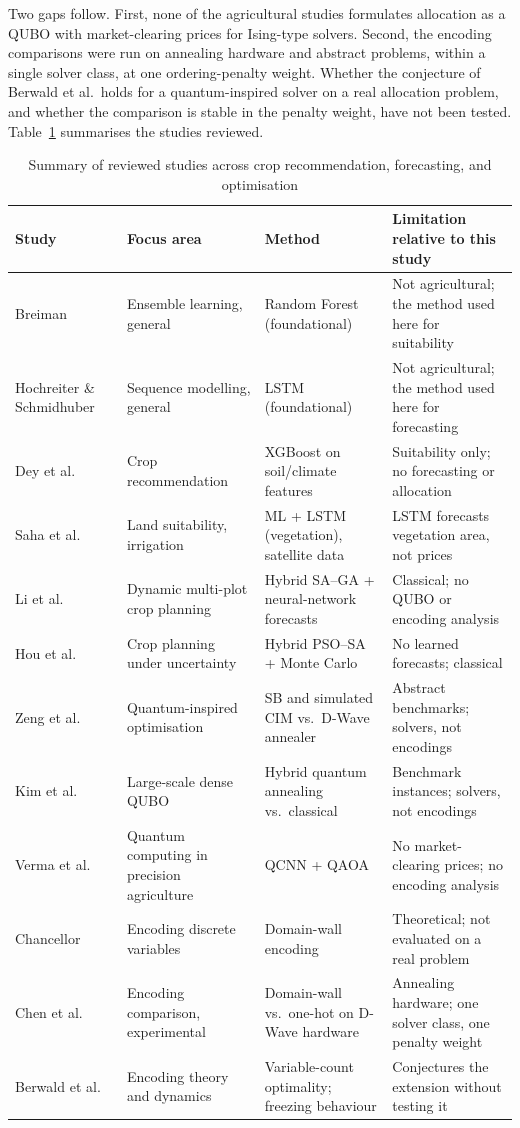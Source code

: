 \documentclass[conference,a4paper]{IEEEtran}
\begin{document}
Two gaps follow. First, none of the agricultural studies formulates allocation
as a QUBO with market-clearing prices for Ising-type solvers. Second, the
encoding comparisons were run on annealing hardware and abstract problems,
within a single solver class, at one ordering-penalty weight. Whether the
conjecture of Berwald et al.\ holds for a quantum-inspired solver on a real
allocation problem, and whether the comparison is stable in the penalty
weight, have not been tested. Table~\ref{tab:lit} summarises the studies
reviewed.

\begin{table}[t]
\centering
\caption{Summary of reviewed studies across crop recommendation, forecasting, and optimisation}
\label{tab:lit}
\footnotesize
\begin{tabular}{p{2.5cm}p{3.0cm}p{3.9cm}p{6.6cm}}
\toprule
Study & Focus area & Method & Limitation relative to this study \\
\midrule
Breiman~\cite{breiman2001} & Ensemble learning, general & Random Forest (foundational) & Not agricultural; the method used here for suitability \\
Hochreiter \& Schmidhuber~\cite{hochreiter1997} & Sequence modelling, general & LSTM (foundational) & Not agricultural; the method used here for forecasting \\
Dey et al.~\cite{dey2024} & Crop recommendation & XGBoost on soil/climate features & Suitability only; no forecasting or allocation \\
Saha et al.~\cite{saha2025} & Land suitability, irrigation & ML + LSTM (vegetation), satellite data & LSTM forecasts vegetation area, not prices \\
Li et al.~\cite{li2025} & Dynamic multi-plot crop planning & Hybrid SA--GA + neural-network forecasts & Classical; no QUBO or encoding analysis \\
Hou et al.~\cite{hou2026} & Crop planning under uncertainty & Hybrid PSO--SA + Monte Carlo & No learned forecasts; classical \\
Zeng et al.~\cite{zeng2024} & Quantum-inspired optimisation & SB and simulated CIM vs.\ D-Wave annealer & Abstract benchmarks; solvers, not encodings \\
Kim et al.~\cite{kim2025} & Large-scale dense QUBO & Hybrid quantum annealing vs.\ classical & Benchmark instances; solvers, not encodings \\
Verma et al.~\cite{verma2025} & Quantum computing in precision agriculture & QCNN + QAOA & No market-clearing prices; no encoding analysis \\
Chancellor~\cite{chancellor2019} & Encoding discrete variables & Domain-wall encoding & Theoretical; not evaluated on a real problem \\
Chen et al.~\cite{chen2021} & Encoding comparison, experimental & Domain-wall vs.\ one-hot on D-Wave hardware & Annealing hardware; one solver class, one penalty weight \\
Berwald et al.~\cite{berwald2022} & Encoding theory and dynamics & Variable-count optimality; freezing behaviour & Conjectures the extension without testing it \\
\bottomrule
\end{tabular}
\end{table}
\end{document}
